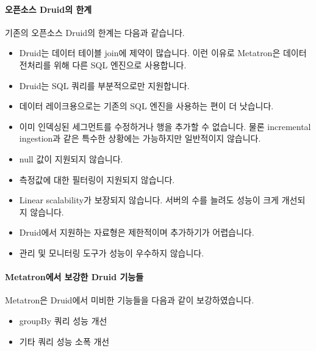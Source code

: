 \documentclass[letterpaper,10pt,english]{sphinxmanual}
\begin{document}
\paragraph{오픈소스 Druid의 한계}
\label{\detokenize{discovery/part01/druid_to_metatron:id4}}
기존의 오픈소스 Druid의 한계는 다음과 같습니다.
\begin{itemize}
\item {} 
Druid는 데이터 테이블 join에 제약이 많습니다. 이런 이유로 Metatron은 데이터 전처리를 위해 다른 SQL 엔진으로 사용합니다.

\item {} 
Druid는 SQL 쿼리를 부분적으로만 지원합니다.

\item {} 
데이터 레이크용으로는 기존의 SQL 엔진을 사용하는 편이 더 낫습니다.

\item {} 
이미 인덱싱된 세그먼트를 수정하거나 행을 추가할 수 없습니다. 물론 incremental ingestion과 같은 특수한 상황에는 가능하지만 일반적이지 않습니다.

\item {} 
null 값이 지원되지 않습니다.

\item {} 
측정값에 대한 필터링이 지원되지 않습니다.

\item {} 
Linear scalability가 보장되지 않습니다. 서버의 수를 늘려도 성능이 크게 개선되지 않습니다.

\item {} 
Druid에서 지원하는 자료형은 제한적이며 추가하기가 어렵습니다.

\item {} 
관리 및 모니터링 도구가 성능이 우수하지 않습니다.

\end{itemize}


\paragraph{Metatron에서 보강한 Druid 기능들}
\label{\detokenize{discovery/part01/druid_to_metatron:id5}}
Metatron은 Druid에서 미비한 기능들을 다음과 같이 보강하였습니다.

\begin{itemize}
\item {} 
groupBy 쿼리 성능 개선

\item {} 
기타 쿼리 성능 소폭 개선

\end{itemize}
\end{document}

